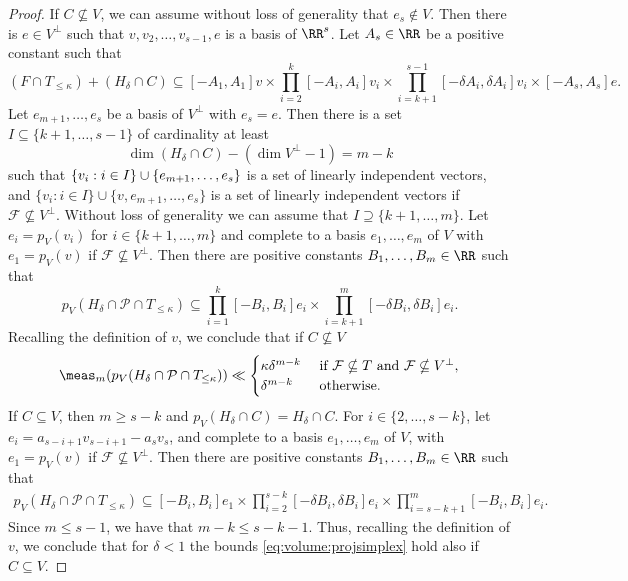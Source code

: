 \begin{proof}
If $C\nsubseteq V$, we can assume without loss of generality that $e_s\notin V$. Then there is $e\in V^{\perp}$ such that $v, v_2,\dots,v_{s-1},e$ is a basis of $\RR^s$.
Let $A_s\in\RR$ be a positive constant such that
\begin{equation*}
(F\cap T_{\leq\kappa})+(H_\delta\cap C)\subseteq [- A_1, A_1] v\times \prod_{i=2}^{k}[-A_i, A_i]v_i\times \prod_{i=k+1}^{s-1}[-\delta A_i, \delta A_i]v_i\times [-A_s, A_s]e.
\end{equation*}
Let $e_{m+1},\dots, e_s$ be a basis of $V^{\perp}$ with $e_s\!=\!e$. Then there is a set \hbox{$I\subseteq\{k+1,\dots,s-1\}$} of cardinality at least
\[
\dim (H_\delta\cap C)-(\dim V^{\perp}-1)=m-k
\]
such that $\{v_i:\nobreak i\in\nobreak I\}\cup\{e_{m+1},\dots,e_s\}$ is a set of linearly independent vectors, and $\{v_i:i\in I\}\cup\{v, e_{m+1},\dots,e_s\}$ is a set of linearly independent vectors if $\mathcal F\nsubseteq V^{\perp}$.
Without loss of generality we can assume that $I\supseteq\{k+1,\dots,m\}$. Let $e_i=p_V(v_i)$ for $i\in\{k+1,\dots,m\}$ and complete to a basis $e_1,\dots,e_m$ of $V$ with $e_1=p_V(v)$ if $\mathcal F\nsubseteq V^{\perp}$.
Then there are positive constants $B_1,\dots,B_m\in \RR$ such that
\begin{equation*}\label{eq:volume:CnotinV}
p_V(H_\delta\cap\mathcal P\cap T_{\leq\kappa})\subseteq \prod_{i=1}^{k}[-B_i, B_i]e_i\times \prod_{i=k+1}^{m}[-\delta B_i, \delta B_i]e_i.
\end{equation*}
Recalling the definition of $v$, we conclude that if $C\nsubseteq V$
\begin{equation}\label{eq:volume:projsimplex}
\meas_m(p_V(H_\delta\cap\mathcal P\cap T_{\leq\kappa}))\ll\begin{cases}\kappa\delta^{m-k} & \text{ if } \mathcal F\nsubseteq T \text{ and } \mathcal F\nsubseteq V^{\perp}, \\
\delta^{m-k} & \text{ otherwise.}
\end{cases}
\end{equation}
If $C\subseteq V$, then $m\geq s-k$ and $p_V(H_\delta\cap C)=H_\delta\cap C$. For $i\in\{2,\dots,s-k\}$, let $e_i= a_{s-i+1}v_{s-i+1}-a_sv_s$, and complete to a basis $e_1,\dots,e_m$ of $V$, with $e_1=p_V(v)$ if $\mathcal F\nsubseteq V^{\perp}$. Then there are positive constants $B_1,\dots,B_m\in\RR$ such that
\begin{gather*}\label{eq:volume:CinV}
p_V(H_\delta\cap\mathcal P\cap T_{\leq\kappa})\subseteq [- B_i, B_i]e_1 \times \prod_{i=2}^{s-k}[-\delta B_i, \delta B_i]e_i\times \prod_{i=s-k+1}^{m}[- B_i, B_i]e_i.
\end{gather*}
Since $m\leq s-1$, we have that $m-k\leq s-k-1$. Thus,
recalling the definition of $v$, we conclude that for $\delta < 1$ the bounds \eqref{eq:volume:projsimplex} hold also if $C\subseteq V$.


\end{proof}
